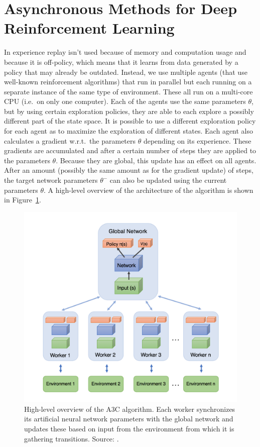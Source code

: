 \section{Asynchronous Methods for Deep Reinforcement Learning}
\label{sec:a3c}
In \cite{Mnih2016AsynchronousLearning} experience replay isn't used because of memory and computation usage and because it is off-policy, which means that it learns from data generated by a policy that may already be outdated.
Instead, we use multiple agents (that use well-known reinforcement algorithms) that run in parallel but each running on a separate instance of the same type of environment.
These all run on a multi-core CPU (i.e.\ on only one computer).
Each of the agents use the same parameters $\theta$, but by using certain exploration policies, they are able to each explore a possibly different part of the state space.
It is possible to use a different exploration policy for each agent as to maximize the exploration of different states.
Each agent also calculates a gradient w.r.t.\ the parameters $\theta$ depending on its experience.
These gradients are accumulated and after a certain number of steps they are applied to the parameters $\theta$.
Because they are global, this update has an effect on all agents.
After an amount (possibly the same amount as for the gradient update) of steps, the target network parameters $\theta^{-}$ can also be updated using the current parameters $\theta$. A high-level overview of the architecture of the algorithm is shown in Figure~\ref{fig:a3carchitecture}.\\
\begin{figure}[htb]
    \centering
    \includegraphics[width=.8\linewidth]{images/A3Carchitecture.png}
    \caption[High-level overview of the A3C algorithm]{High-level overview of the A3C algorithm. Each worker synchronizes its artificial neural network parameters with the global network and updates these based on input from the environment from which it is gathering transitions. Source: \cite{Juliani2016A3C}.}
    \label{fig:a3carchitecture}
\end{figure}
